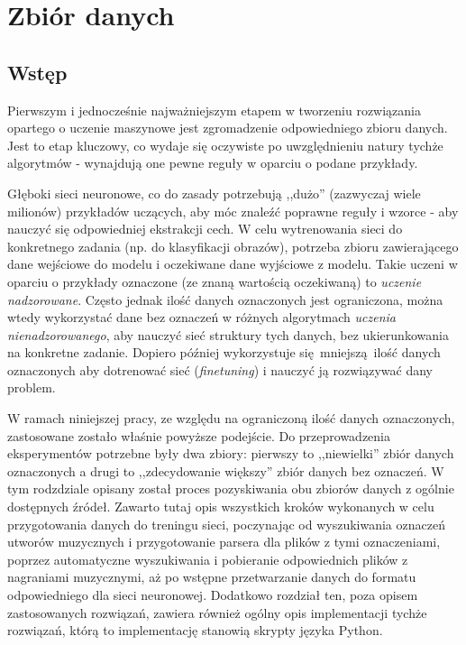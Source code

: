 \chapter{Zbiór danych}

\section{Wstęp}

Pierwszym i jednocześnie najważniejszym etapem w tworzeniu rozwiązania opartego o uczenie maszynowe
jest zgromadzenie odpowiedniego zbioru danych. Jest to etap kluczowy, co wydaje się oczywiste po
uwzględnieniu natury tychże algorytmów - wynajdują one pewne reguły w oparciu o podane przykłady.

Głęboki sieci neuronowe, co do zasady potrzebują ,,dużo'' (zazwyczaj wiele milionów) przykładów
uczących, aby móc znaleźć poprawne reguły i wzorce - aby nauczyć się odpowiedniej ekstrakcji cech. W
celu wytrenowania sieci do konkretnego zadania (np. do klasyfikacji obrazów), potrzeba zbioru
zawierającego dane wejściowe do modelu i oczekiwane dane wyjściowe z modelu. Takie uczeni w oparciu
o przykłady oznaczone (ze znaną wartością oczekiwaną) to \emph{uczenie nadzorowane}. Często jednak
ilość danych oznaczonych jest ograniczona, można wtedy wykorzystać dane bez oznaczeń w różnych
algorytmach \emph{uczenia nienadzorowanego}, aby nauczyć sieć struktury tych danych, bez
ukierunkowania na konkretne zadanie. Dopiero później wykorzystuje się mniejszą ilość danych
oznaczonych aby dotrenować sieć (\emph{finetuning}) i nauczyć ją rozwiązywać dany problem.

W ramach niniejszej pracy, ze względu na ograniczoną ilość danych oznaczonych, zastosowane zostało
właśnie powyższe podejście. Do przeprowadzenia eksperymentów potrzebne były dwa zbiory: pierwszy to
,,niewielki'' zbiór danych oznaczonych a drugi to ,,zdecydowanie większy'' zbiór danych bez
oznaczeń. W tym rodzdziale opisany został proces pozyskiwania obu zbiorów danych z ogólnie
dostępnych źródeł. Zawarto tutaj opis wszystkich kroków wykonanych w celu przygotowania danych do
treningu sieci, poczynając od wyszukiwania oznaczeń utworów muzycznych i przygotowanie parsera dla
plików z tymi oznaczeniami, poprzez automatyczne wyszukiwania i pobieranie odpowiednich plików z
nagraniami muzycznymi, aż po wstępne przetwarzanie danych do formatu odpowiedniego dla sieci
neuronowej. Dodatkowo rozdział ten, poza opisem zastosowanych rozwiązań, zawiera również ogólny opis
implementacji tychże rozwiązań, którą to implementację stanowią skrypty języka Python.


